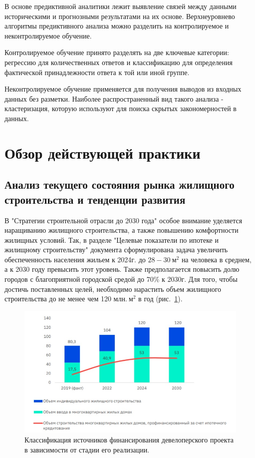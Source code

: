 \documentclass[12pt,a4paper]{article} %
\begin{document}
В основе предиктивной аналитики лежит выявление связей между данными историческими и прогнозными результатами на их основе. Верхнеуровнево алгоритмы предиктивного анализа можно разделить на контролируемое и неконтролируемое обучение.

Контролируемое обучение принято разделять на две ключевые категории: регрессию для количественных ответов и классификацию для определения фактической принадлежности ответа к той или иной группе. 
 
Неконтролируемое обучение применяется для получения выводов из входных данных без разметки. Наиболее распространенный вид такого анализа - кластеризация, которую используют для поиска скрытых закономерностей в данных.


\newpage
\section{Обзор действующей практики}
\subsection{Анализ текущего состояния рынка жилищного строительства и тенденции развития}

В "Стратегии строительной отрасли до 2030 года" особое внимание уделяется наращиванию жилищного строительства, а также повышению комфортности жилищных условий. Так, в разделе "Целевые показатели по ипотеке и жилищному строительству" документа сформулирована задача увеличить обеспеченность населения жильем к 2024г. до $28-30~\text{м}^2$ на человека в среднем, а к 2030 году превысить этот уровень. Также предполагается повысить долю городов с благоприятной городской средой до 70\% к 2030г. Для того, чтобы достичь поставленных целей, необходимо нарастить объем жилищного строительства до не менее чем 120 млн.$~\text{м}^2$ в год (рис.~\ref{fig:develop_dynam}).

\begin{figure}[h]
	
	\centering
	
	\includegraphics[width=0.7\linewidth]{develop_dynam.jpg}
	
	\caption{Классификация источников финансирования девелоперского проекта в зависимости от стадии его реализации.}
	
	\label{fig:develop_dynam}
	
\end{figure}
\end{document}
